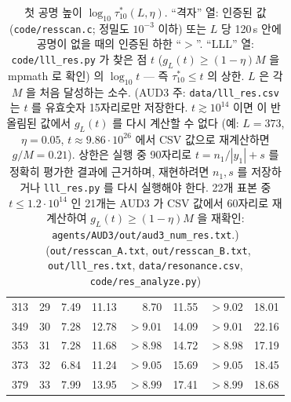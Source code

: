 \begin{table}[ht]
\begin{tabular}{rrrrrrrr}
313 & 29 & 7.49 & 11.13 & 8.70 & 11.55 & $>9.02$ & 18.01\\
349 & 30 & 7.28 & 12.78 & $>9.01$ & 14.09 & $>9.01$ & 22.16\\
353 & 31 & 7.28 & 11.68 & $>8.98$ & 14.72 & $>8.98$ & 17.19\\
373 & 32 & 6.84 & 11.24 & $>9.05$ & 15.69 & $>9.05$ & 18.45\\
379 & 33 & 7.99 & 13.95 & $>8.99$ & 17.41 & $>8.99$ & 18.68\\
\bottomrule
\end{tabular}
\caption{첫 공명 높이 $\log_{10}\tau^*_{10}(L,\eta)$. ``격자'' 열: 인증된 값 (\texttt{code/resscan.c}; 정밀도 $10^{-3}$ 이하) 또는
$L$ 당 120\,s 안에 공명이 없을 때의 인증된 하한 ``$>$''. ``LLL'' 열: \texttt{code/lll\_res.py} 가 찾은 점 $t$ ($g_L(t)\ge(1-\eta)M$ 을 mpmath 로 확인) 의
$\log_{10}t$ --- 즉 $\tau^*_{10}\le t$ 의 상한. $L$ 은 각 $M$ 을 처음 달성하는 소수.
(AUD3 주: \texttt{data/lll\_res.csv} 는 $t$ 를 유효숫자 15자리로만 저장한다. $t\gtrsim10^{14}$ 이면 이 반올림된 값에서 $g_L(t)$ 를 다시 계산할 수 없다
(예: $L=373$, $\eta=0.05$, $t\approx9.86\cdot10^{26}$ 에서 CSV 값으로 재계산하면 $g/M=0.21$). 상한은 실행 중 90자리로 $t=n_1/|y_1|+s$ 를 정확히 평가한 결과에 근거하며,
재현하려면 $n_1,s$ 를 저장하거나 \texttt{lll\_res.py} 를 다시 실행해야 한다. 22개 표본 중 $t\le1.2\cdot10^{14}$ 인 21개는 AUD3 가 CSV 값에서 60자리로 재계산하여 $g_L(t)\ge(1-\eta)M$ 을 재확인: \texttt{agents/AUD3/out/aud3\_num\_res.txt}.) \NUMERIC\
(\texttt{out/resscan\_A.txt}, \texttt{out/resscan\_B.txt}, \texttt{out/lll\_res.txt}, \texttt{data/resonance.csv}, \texttt{code/res\_analyze.py})}\label{NUM:tab-res}
\end{table}

